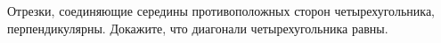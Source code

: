\begin{ex}
	\begin{condition}
		Отрезки, соединяющие середины противоположных сторон четырехугольника, перпендикулярны. Докажите, что диагонали четырехугольника равны.
	\end{condition}
\end{ex}
